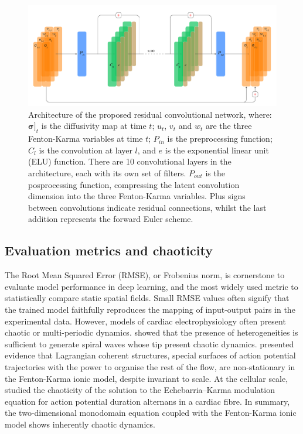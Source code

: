 \documentclass[utf8]{frontiersSCNS} %
\begin{document}
\begin{figure}[tb]
    \centering
    \includegraphics[width=\textwidth]{Figure-2.jpg}
    \caption{
    Architecture of the proposed residual convolutional network, where: $\boldsymbol{\sigma]}_t$ is the diffusivity map at time $t$; $u_t$, $v_t$ and $w_t$ are the three Fenton-Karma variables at time $t$; $P_{in}$ is the preprocessing function; $C_l$ is the convolution at layer $l$, and $e$ is the exponential linear unit (ELU) function.  There are 10 convolutional layers in the architecture, each with its own set of filters. $P_{out}$ is the posprocessing function, compressing the latent convolution dimension into the three Fenton-Karma variables. Plus signs between convolutions indicate residual connections, whilst the last addition represents the forward Euler scheme. 
    }
    \label{fig:network}
\end{figure}



\subsection{Evaluation metrics and chaoticity}
\label{sec:methods:evaluation}
The Root Mean Squared Error (RMSE), or Frobenius norm, is cornerstone to evaluate model performance in deep learning, and the most widely used metric to statistically compare static spatial fields.
Small RMSE values often signify that the trained model faithfully reproduces the mapping of input-output pairs in the experimental data.
However, models of cardiac electrophysiology often present chaotic or multi-periodic dynamics.
\cite{lombardo2019chaotic} showed that the presence of heterogeneities is sufficient to generate spiral waves whose tip present chaotic dynamics.
\cite{sohn2019scale} presented evidence that Lagrangian coherent structures, special surfaces of action potential trajectories with the power to organise the rest of the flow, are non-stationary in the Fenton-Karma ionic model, despite invariant to scale.
At the cellular scale, \cite{dai2010chaos} studied the chaoticity of the solution to the Echebarria–Karma modulation equation \cite[]{echebarria2002instability} for action potential duration alternans in a cardiac fibre.
In summary, the two-dimensional monodomain equation coupled with the Fenton-Karma ionic model shows inherently chaotic dynamics.
\end{document}
